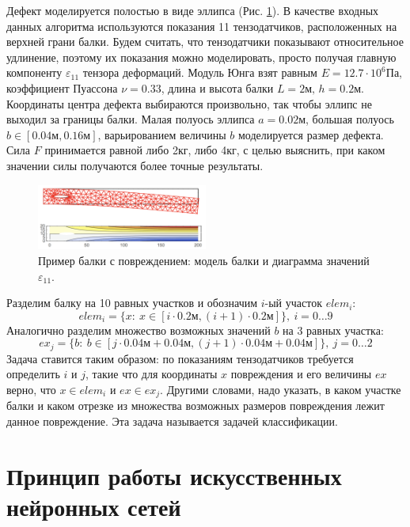 \documentclass[a4paper,12pt]{article}
\theoremstyle{remark}
\begin{document}
	Дефект моделируется полостью в виде эллипса (Рис. \ref{fig:beam_sample}). В качестве входных данных алгоритма используются показания 11 тензодатчиков, расположенных на верхней грани балки. Будем считать, что тензодатчики показывают относительное удлинение, поэтому их показания можно моделировать, просто получая главную компоненту $\varepsilon_{11}$ тензора деформаций. Модуль Юнга взят равным $E = 12.7 \cdot 10^6 \text{Па}$, коэффициент Пуассона $\nu = 0.33$, длина и высота балки $L = 2 \text{м, } h = 0.2 \text{м}$. Координаты центра дефекта выбираются произвольно, так чтобы эллипс не выходил за границы балки. Малая полуось эллипса $a = 0.02 \text{м}$, большая полуось $b \in [0.04\text{м}, 0.16\text{м}]$, варьированием величины $b$ моделируется размер дефекта. Сила $F$ принимается равной либо 2кг, либо 4кг, с целью выяснить, при каком значении силы получаются более точные результаты.
	\begin{figure}[h]
		\centering
		\includegraphics[width=0.5\textwidth]{beam_sample.png}
		\caption{Пример балки с повреждением: модель балки и диаграмма значений $\varepsilon_{11}$.}
		\label{fig:beam_sample}
	\end{figure}

	Разделим балку на 10 равных участков и обозначим $i$-ый участок $elem_i$:
	\begin{equation}
		elem_i = \{x: \ x \in [i \cdot 0.2\text{м}, (i+1) \cdot 0.2\text{м}]\}, \ i=0 \dots 9
	\end{equation}
	Аналогично разделим множество возможных значений $b$ на 3 равных участка:
	\begin{equation}
		ex_j = \{b: \ b \in [j \cdot 0.04\text{м} + 0.04\text{м}, (j+1) \cdot 0.04\text{м} + 0.04\text{м}]\}, \ j=0 \dots 2
	\end{equation}
	Задача ставится таким образом: по показаниям тензодатчиков требуется определить $i$ и $j$, такие что для координаты $x$ повреждения и его величины $ex$ верно, что $x \in elem_i$ и $ex \in ex_j$. Другими словами, надо указать, в каком участке балки и каком отрезке из множества возможных размеров повреждения лежит данное повреждение. Эта задача называется задачей классификации.
	
	\newpage
	\section{Принцип работы искусственных нейронных сетей}
	\label{sec:neural_networks}
	
\end{document}
